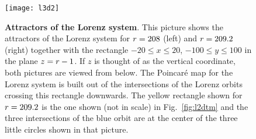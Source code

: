 \begin{figure}
 \centering
\texttt{[image: l3d2]}
 \caption{{\bf Attractors of the Lorenz system}. 
    This picture shows the attractors of the Lorenz system for $r=208$ (left) and $r=209.2$ (right) together with the rectangle $-20\leq x\leq20$, $-100\leq y\leq100$ in the plane $z=r-1$. 
    If $z$ is thought of as the vertical coordinate, both pictures are viewed from below.
    The Poincar\'e map for the Lorenz system is built out of the intersections of the Lorenz orbits crossing this rectangle downwards. The yellow rectangle shown for $r=209.2$ is the one shown (not in scale) in Fig.~\ref{fig:l2dtm} and the three intersections of the blue orbit are at the center of the three little circles shown in that picture. 
 }
 \label{fig:l3d}
\end{figure} 